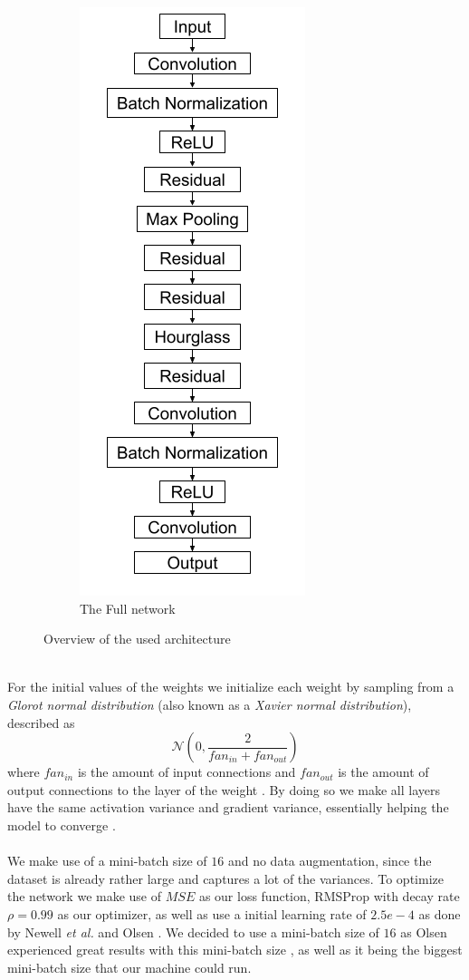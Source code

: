 \documentclass[./main.tex]{subfiles}
\begin{document}
\begin{figure}[p]
\begin{subfigure}{5 cm}
        \centering
        \includegraphics[width = 4 cm]{entities/SHG_drawing.png}
        \caption{The Full network}
    \end{subfigure}
    \caption{Overview of the used architecture}
    \label{fig:architecture}
\end{figure}
\\
For the initial values of the weights we initialize each weight by sampling from a \textit{Glorot normal distribution} (also known as a \textit{Xavier normal distribution}), described as
$$\mathcal{N} \left(0, \frac{2}{fan_{in} + fan_{out}} \right)$$
where $fan_{in}$ is the amount of input connections and $fan_{out}$ is the amount of output connections to the layer of the weight \cite{Xavier}. By doing so we make all layers have the same activation variance and gradient variance, essentially helping the model to converge \cite{DeepLearning}.
\\
\\
We make use of a mini-batch size of $16$ and no data augmentation, since the dataset is already rather large and captures a lot of the variances. To optimize the network we make use of $MSE$ as our loss function, RMSProp with decay rate $\rho = 0.99$ as our optimizer, as well as use a initial learning rate of $2.5e-4$ as done by Newell \textit{et al.} \cite{Newell} and Olsen \cite{Camilla}. We decided to use a mini-batch size of $16$ as Olsen experienced great results with this mini-batch size \cite{Camilla}, as well as it being the biggest mini-batch size that our machine could run.
\\
\\
\end{document}
